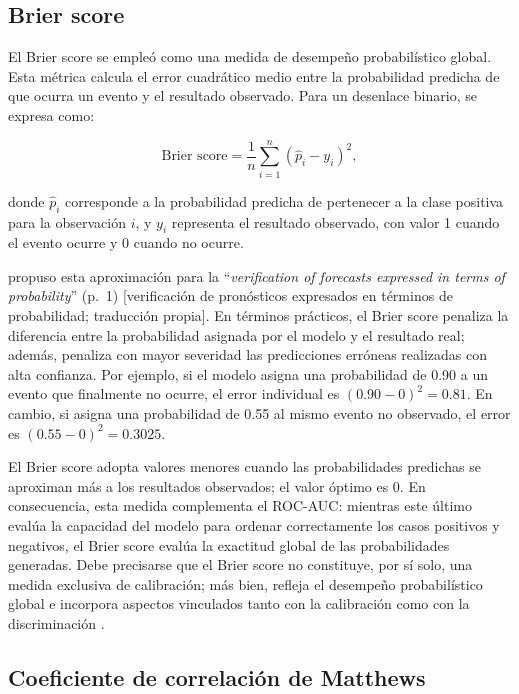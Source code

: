 \subsection{Brier score}

El Brier score se empleó como una medida de desempeño probabilístico global. Esta
métrica calcula el error cuadrático medio entre la probabilidad predicha de que
ocurra un evento y el resultado observado. Para un desenlace binario, se expresa
como:

\begin{equation}
\text{Brier score}=\frac{1}{n}\sum_{i=1}^{n}(\hat{p}_{i}-y_i)^2,
\end{equation}

donde $\hat{p}_{i}$ corresponde a la probabilidad predicha de pertenecer a la clase
positiva para la observación $i$, y $y_i$ representa el resultado observado, con
valor 1 cuando el evento ocurre y 0 cuando no ocurre.

 propuso esta aproximación para la ``\emph{verification
of forecasts expressed in terms of probability}'' (p.~1) [verificación de
pronósticos expresados en términos de probabilidad; traducción propia]. En términos
prácticos, el Brier score penaliza la diferencia entre la probabilidad asignada por
el modelo y el resultado real; además, penaliza con mayor severidad las
predicciones erróneas realizadas con alta confianza. Por ejemplo, si el modelo
asigna una probabilidad de 0.90 a un evento que finalmente no ocurre, el error
individual es $(0.90-0)^2=0.81$. En cambio, si asigna una probabilidad de 0.55 al
mismo evento no observado, el error es $(0.55-0)^2=0.3025$.

El Brier score adopta valores menores cuando las probabilidades predichas se
aproximan más a los resultados observados; el valor óptimo es 0. En consecuencia,
esta medida complementa el ROC-AUC: mientras este último evalúa la capacidad del
modelo para ordenar correctamente los casos positivos y negativos, el Brier score
evalúa la exactitud global de las probabilidades generadas. Debe precisarse que el
Brier score no constituye, por sí solo, una medida exclusiva de calibración; más
bien, refleja el desempeño probabilístico global e incorpora aspectos vinculados
tanto con la calibración como con la discriminación \cite{riley2024evaluation}.

\subsection{Coeficiente de correlación de Matthews}

